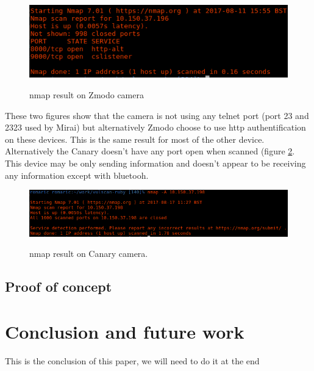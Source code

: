 \documentclass{report}
\begin{document}
\begin{figure}[h]
 \caption{nmap result on Zmodo camera}
 \centering
 \includegraphics[width=1.2\textwidth]{./img/exp/resultelse}
 \label{fig:resultelse-zm}
\end{figure}
These two figures show that the camera is not using any telnet port (port 23 and 2323 used by Mirai) but alternatively Zmodo choose to use http authentification on these devices. This is the same result for most of the other device.\newline
Alternatively the Canary doesn't have any port open when scanned (figure \ref{fig:canary}. This device may be only sending information and doesn't appear to be receiving any information except with bluetooh.
\newpage
\begin{figure}[h]
 \caption{nmap result on Canary \protect\footnotemark camera.}
 \centering
 \includegraphics[width=1.2\textwidth]{./img/exp/canary}
 \label{fig:canary}
\end{figure}


\section{Proof of concept}

\chapter{Conclusion and future work}
This is the conclusion of this paper, we will need to do it at the end

\printbibliography

\listoffigures
\end{document}
